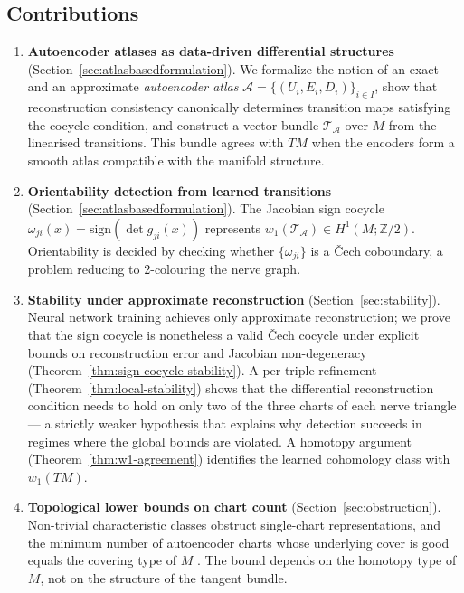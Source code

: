 \documentclass[11pt]{article}
\newcommand{\Z}{\mathbb{Z}}
\newcommand{\sign}{\mathrm{sign}}
\theoremstyle{plain}
\theoremstyle{definition}
\theoremstyle{remark}
\begin{document}
\subsection*{Contributions}

\begin{enumerate}
\item \textbf{Autoencoder atlases as data-driven differential structures} (Section~\ref{sec:atlasbasedformulation}). We formalize the notion of an exact and an approximate \emph{autoencoder atlas} $\mathcal{A} = \{(U_i, E_i, D_i)\}_{i \in I}$, show that reconstruction consistency canonically determines transition maps satisfying the cocycle condition, and construct a vector bundle $\mathcal{T}_\mathcal{A}$ over $M$ from the linearised transitions. This bundle agrees with $TM$ when the encoders form a smooth atlas compatible with the manifold structure.

\item \textbf{Orientability detection from learned transitions} (Section~\ref{sec:atlasbasedformulation}). The Jacobian sign cocycle $\omega_{ji}(x) = \sign(\det g_{ji}(x))$ represents $w_1(\mathcal{T}_\mathcal{A}) \in H^1(M; \Z/2)$. Orientability is decided by checking whether $\{\omega_{ji}\}$ is a \v{C}ech coboundary, a problem reducing to 2-colouring the nerve graph.

\item \textbf{Stability under approximate reconstruction} (Section~\ref{sec:stability}). Neural network training achieves only approximate reconstruction; we prove that the sign cocycle is nonetheless a valid \v{C}ech cocycle under explicit bounds on reconstruction error and Jacobian non-degeneracy (Theorem~\ref{thm:sign-cocycle-stability}). A per-triple refinement (Theorem~\ref{thm:local-stability}) shows that the differential reconstruction condition needs to hold on only two of the three charts of each nerve triangle — a strictly weaker hypothesis that explains why detection succeeds in regimes where the global bounds are violated. A homotopy argument (Theorem~\ref{thm:w1-agreement}) identifies the learned cohomology class with $w_1(TM)$.

\item \textbf{Topological lower bounds on chart count} (Section~\ref{sec:obstruction}). Non-trivial characteristic classes obstruct single-chart representations, and the minimum number of autoencoder charts whose underlying cover is good equals the covering type of $M$ \cite{Karoubi2017}. The bound depends on the homotopy type of $M$, not on the structure of the tangent bundle.
\end{enumerate}
\end{document}
